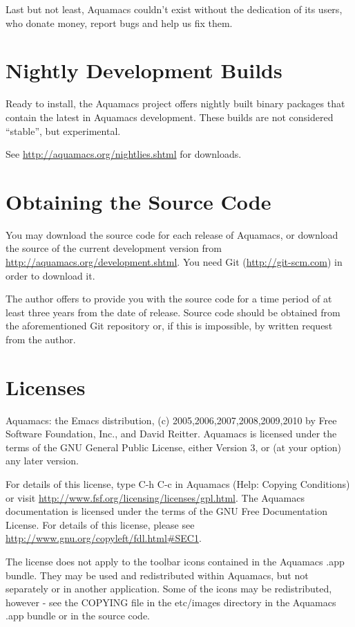 \documentclass[11pt,letterpaper]{article}
\begin{document}
Last but not least, Aquamacs couldn't exist without the dedication of
its users, who donate money, report bugs and help us fix them.

\section {Nightly Development Builds}

Ready to install, the Aquamacs project offers nightly built binary
packages that contain the latest in Aquamacs development. These builds
are not considered ``stable'', but experimental.

See \url{http://aquamacs.org/nightlies.shtml} for downloads.


\section {Obtaining the Source Code}

You may download the source code for each release of Aquamacs, or
download the source of the current development version from
\url{http://aquamacs.org/development.shtml}.  You need Git (\url{http://git-scm.com}) in order to download it.

The author offers  to provide you with the source code for a time period of
at least three years from the date of release. Source code should be
obtained from the aforementioned Git repository or,
if this is impossible, by written request from the author.

\section {Licenses}

Aquamacs: the Emacs distribution, (c) 2005,2006,2007,2008,2009,2010 by Free Software
Foundation, Inc., and David Reitter. Aquamacs is licensed under the
terms of the GNU General Public License, either Version 3, or (at your
option) any later version. 

For details of
this license, type C-h C-c in Aquamacs (Help: Copying Conditions) or
visit \url{http://www.fsf.org/licensing/licenses/gpl.html}. The
Aquamacs documentation is licensed under the terms of the GNU Free
Documentation License. For details of this license, please see
\url{http://www.gnu.org/copyleft/fdl.html#SEC1}.

The license does not apply to the toolbar icons contained in the
Aquamacs .app bundle. They may be used and redistributed within
Aquamacs, but not separately or in another application. Some of the
icons may be redistributed, however - see the COPYING file in the etc/images
directory in the Aquamacs .app bundle or in the source code.



\end{document}
